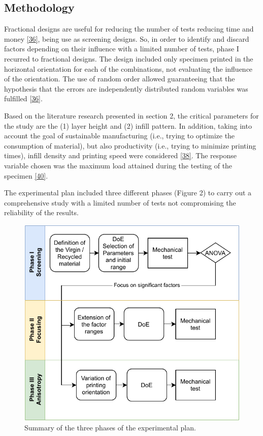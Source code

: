 \documentclass[conference,final,]{IEEEtran}
\begin{document}
\hypertarget{methodology}{%
\subsection{Methodology}\label{methodology}}

Fractional designs are useful for reducing the number of tests reducing
time and money \protect\hyperlink{ref-Montgomery2001}{{[}36{]}}, being
use as screening designs. So, in order to identify and discard factors
depending on their influence with a limited number of tests, phase I
recurred to fractional designs. The design included only specimen
printed in the horizontal orientation for each of the combinations, not
evaluating the influence of the orientation. The use of random order
allowed guaranteeing that the hypothesis that the errors are
independently distributed random variables was fulfilled
\protect\hyperlink{ref-Montgomery2001}{{[}36{]}}.

Based on the literature research presented in section 2, the critical
parameters for the study are the (1) layer height and (2) infill
pattern. In addition, taking into account the goal of sustainable
manufacturing (i.e., trying to optimize the consumption of material),
but also productivity (i.e., trying to minimize printing times), infill
density and printing speed were considered
\protect\hyperlink{ref-Tanveer2019}{{[}38{]}}. The response variable
chosen was the maximum load attained during the testing of the specimen
\protect\hyperlink{ref-Letcher2015}{{[}40{]}}.

The experimental plan included three different phases (Figure 2) to
carry out a comprehensive study with a limited number of tests not
compromising the reliability of the results.

\begin{figure}

{\centering \includegraphics[width=0.8\linewidth]{Figures/Methodology} 

}

\caption{Summary of the three phases of the experimental plan.}\label{fig:Fig.Methodology}
\end{figure}
\end{document}
